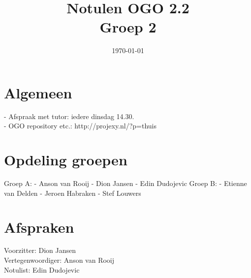 \documentclass[a4paper,twoside,11pt]{article}
\title{\vspace{-\baselineskip}\sffamily\bfseries Notulen OGO 2.2 \\ Groep 2}
\date{\today}
\begin{document}
\maketitle

\section{Algemeen}
- Afspraak met tutor: iedere dinsdag 14.30. \\
- OGO repository etc.: http://projexy.nl/?p=thuis

\section{Opdeling groepen}
Groep A:
- Anson van Rooij
- Dion Jansen
- Edin Dudojevic
\newline
Groep B:
- Etienne van Delden
- Jeroen Habraken
- Stef Louwers

\section{Afspraken}
Voorzitter: Dion Jansen \\
Vertegenwoordiger: Anson van Rooij \\
Notulist: Edin Dudojevic \\
\end{document}
